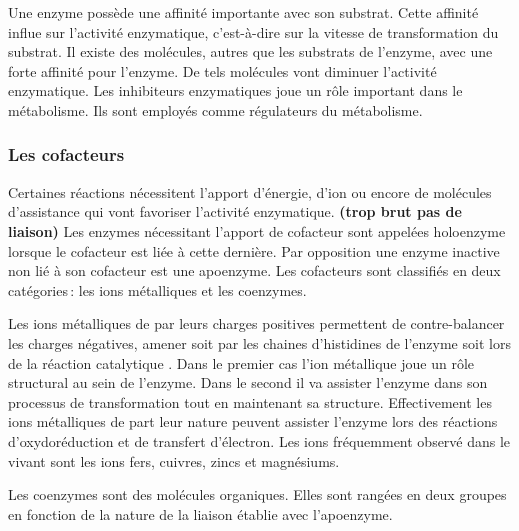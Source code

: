 \begin{refsegment}
    Une enzyme possède une affinité importante avec son substrat. Cette affinité influe sur l’activité enzymatique, c’est-à-dire sur la vitesse de transformation du substrat. Il existe des molécules, autres que les substrats de l’enzyme,  avec  une forte affinité pour l’enzyme. De tels molécules vont diminuer l’activité enzymatique. Les inhibiteurs enzymatiques joue un rôle important dans le métabolisme. Ils sont employés comme régulateurs du métabolisme. 
    

    \subsubsection{Les cofacteurs}
    Certaines réactions nécessitent l’apport d'énergie, d’ion ou encore de molécules d'assistance qui vont favoriser l’activité enzymatique. \textbf{(trop brut pas de liaison)} Les enzymes nécessitant l'apport de cofacteur sont appelées holoenzyme lorsque le cofacteur est liée à cette dernière. Par opposition une enzyme inactive non lié à son cofacteur est une apoenzyme. Les cofacteurs sont classifiés en deux catégories : les ions métalliques et les coenzymes.
    
    Les ions métalliques de par leurs charges positives permettent de contre-balancer les charges négatives, amener soit par les chaines d'histidines de l'enzyme soit lors de la réaction catalytique \cite{christianson1991structural}. Dans le premier cas l'ion métallique joue un rôle structural au sein de l'enzyme. Dans le second il va assister l'enzyme dans son processus de transformation tout en maintenant sa structure. Effectivement les ions métalliques de part leur nature peuvent assister l'enzyme lors des réactions d'oxydoréduction et de transfert d'électron. Les ions fréquemment observé dans le vivant sont les ions fers, cuivres, zincs et magnésiums.
    
    Les coenzymes sont des molécules organiques. Elles sont rangées en deux groupes en fonction de la nature de la liaison établie avec l'apoenzyme.
    

\end{refsegment}
